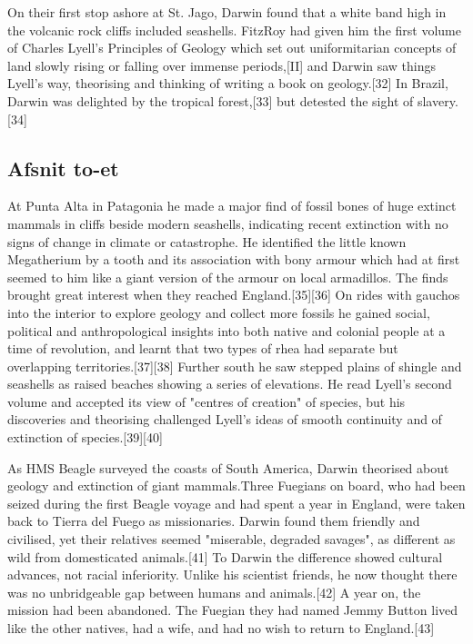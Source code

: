 \documentclass{article}%
\begin{document}
On their first stop ashore at St. Jago, Darwin found that a white band high in the volcanic rock cliffs included seashells. FitzRoy had given him the first volume of Charles Lyell's Principles of Geology which set out uniformitarian concepts of land slowly rising or falling over immense periods,[II] and Darwin saw things Lyell's way, theorising and thinking of writing a book on geology.[32] In Brazil, Darwin was delighted by the tropical forest,[33] but detested the sight of slavery.[34]

\subsection{Afsnit to-et}
At Punta Alta in Patagonia he made a major find of fossil bones of huge extinct mammals in cliffs beside modern seashells, indicating recent extinction with no signs of change in climate or catastrophe. He identified the little known Megatherium by a tooth and its association with bony armour which had at first seemed to him like a giant version of the armour on local armadillos. The finds brought great interest when they reached England.[35][36] On rides with gauchos into the interior to explore geology and collect more fossils he gained social, political and anthropological insights into both native and colonial people at a time of revolution, and learnt that two types of rhea had separate but overlapping territories.[37][38] Further south he saw stepped plains of shingle and seashells as raised beaches showing a series of elevations. He read Lyell's second volume and accepted its view of "centres of creation" of species, but his discoveries and theorising challenged Lyell's ideas of smooth continuity and of extinction of species.[39][40] 

As HMS Beagle surveyed the coasts of South America, Darwin theorised about geology and extinction of giant mammals.Three Fuegians on board, who had been seized during the first Beagle voyage and had spent a year in England, were taken back to Tierra del Fuego as missionaries. Darwin found them friendly and civilised, yet their relatives seemed "miserable, degraded savages", as different as wild from domesticated animals.[41] To Darwin the difference showed cultural advances, not racial inferiority. Unlike his scientist friends, he now thought there was no unbridgeable gap between humans and animals.[42] A year on, the mission had been abandoned. The Fuegian they had named Jemmy Button lived like the other natives, had a wife, and had no wish to return to England.[43]
\end{document}
